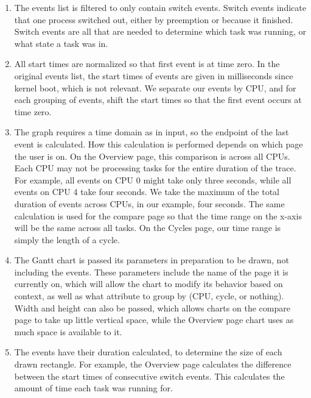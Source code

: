 \documentclass{hmcclinic}
\begin{document}
  \begin{enumerate}

    \item The events list is filtered to only contain switch events. Switch
      events indicate that one process switched out, either by preemption or
      because it finished.
      Switch events are all that are needed to determine which task was running, or
      what state a task was in.
  
    \item All start times are normalized so that first event is at time zero.
      In the original events list, the start times of events are given in
      milliseconds since kernel boot, which is not relevant. We separate our
      events by CPU, and for each grouping of events, shift the start times
      so that the first event occurs at time zero.
  
    \item The graph requires a time domain as in input, so the endpoint of the
      last event is calculated.
      How this calculation is performed depends on which page the user is
      on. On the Overview page, this comparison is across all CPUs. Each CPU may not
      be processing tasks for the entire duration of the trace. For example, all
      events on CPU 0 might take only three seconds, while all events on CPU 4 take
      four seconds. We take the maximum of the total duration of events across CPUs, in our
      example, four seconds. The same calculation is used for the compare page so
      that the time range on the x-axis will be the same across all tasks.  On
      the Cycles page, our time range is simply the length of a cycle.
  
    \item The Gantt chart is passed its parameters in preparation to be drawn,
      not including the events. These parameters include the name of the page it
      is currently on, which will allow the chart to modify its behavior based on
      context, as well as what attribute to group by (CPU, cycle, or nothing).
      Width and height can also be passed, which allows charts on the compare
      page to take up little vertical space, while the Overview page chart uses
      as much space is available to it.
  
   \item The events have their duration calculated, to determine the size of
     each drawn
     rectangle. For example, the Overview page calculates the
     difference between the start times of consecutive switch events. This
     calculates the amount of time each task was running for.
  

\end{enumerate}
\end{document}
